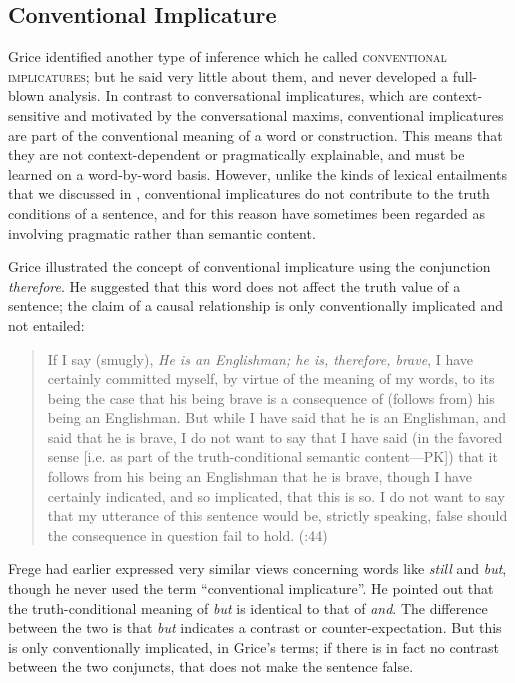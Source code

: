 \subsection{Conventional Implicature}\label{sec:} %

Grice identified another type of inference which he called \textsc{conventional implicatures}; but he said very little about them, and never developed a full-blown analysis. In contrast to conversational implicatures, which are context-sensitive and motivated by the conversational maxims, conventional implicatures are part of the conventional meaning of a word or construction. This means that they are not context-dependent or pragmatically explainable, and must be learned on a word-by-word basis. However, unlike the kinds of lexical entailments that we discussed in , conventional implicatures do not contribute to the truth conditions of a sentence, and for this reason have sometimes been regarded as involving pragmatic rather than semantic content.



Grice illustrated the concept of conventional implicature using the conjunction \textit{therefore}. He suggested that this word does not affect the truth value of a sentence; the claim of a causal relationship is only conventionally implicated and not entailed:


\begin{quote}
If I say (smugly), \textit{He is an Englishman; he is, therefore, brave}, I have certainly committed myself, by virtue of the meaning of my words, to its being the case that his being brave is a consequence of (follows from) his being an Englishman. But while I have said that he is an Englishman, and said that he is brave, I do not want to say that I have said (in the favored sense [i.e. as part of the truth-conditional semantic content—PK]) that it follows from his being an Englishman that he is brave, though I have certainly indicated, and so implicated, that this is so. I do not want to say that my utterance of this sentence would be, strictly speaking, false should the consequence in question fail to hold. (\citealt{Grice1975}:44)
\end{quote}


Frege had earlier expressed very similar views concerning words like \textit{still} and \textit{but}, though he never used the term “conventional implicature”. He pointed out that the truth-conditional meaning of \textit{but} is identical to that of \textit{and}. The difference between the two is that \textit{but} indicates a contrast or counter-expectation. But this is only conventionally implicated, in Grice’s terms; if there is in fact no contrast between the two conjuncts, that does not make the sentence false.


